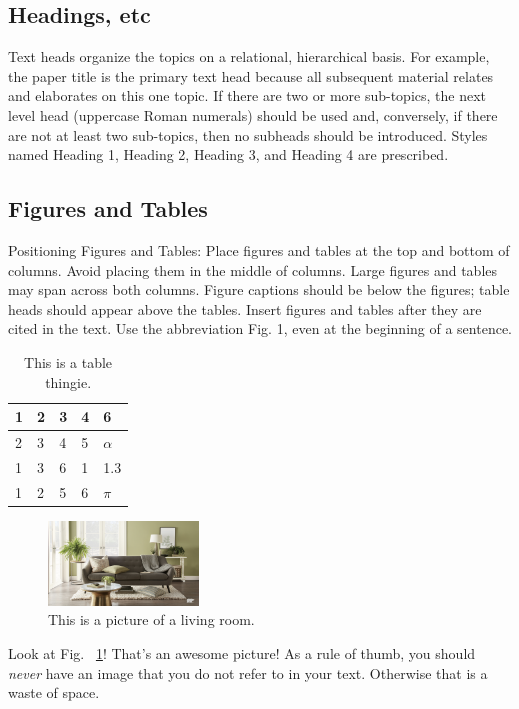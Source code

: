 \documentclass[letterpaper, 10 pt, conference]{ieeeconf}  %
\begin{document}
\subsection{Headings, etc}

Text heads organize the topics on a relational, hierarchical basis. For example, the paper title is the primary text head because all subsequent material relates and elaborates on this one topic. If there are two or more sub-topics, the next level head (uppercase Roman numerals) should be used and, conversely, if there are not at least two sub-topics, then no subheads should be introduced. Styles named Heading 1, Heading 2, Heading 3, and Heading 4 are prescribed.

\subsection{Figures and Tables}

Positioning Figures and Tables: Place figures and tables at the top and bottom of columns. Avoid placing them in the middle of columns. Large figures and tables may span across both columns. Figure captions should be below the figures; table heads should appear above the tables. Insert figures and tables after they are cited in the text. Use the abbreviation Fig. 1, even at the beginning of a sentence.

\begin{table}[]
\centering
\begin{tabular}{|l|l|l|l|l|}
\hline
1 & 2 & 3 & 4 & 6 \\ \hline
2 & 3 & 4 & 5 & $\alpha$ \\ \hline
1 & 3 & 6 & 1 & 1.3 \\ \hline
1 & 2 & 5 & 6 &  $\pi$ \\ \hline
\end{tabular}
\caption{This is a table thingie.}
\end{table}

\begin{figure}[htp]
\centering
\includegraphics[width=4cm]{livingroom.jpeg}
\caption{This is a picture of a living room.}
\label{fig:livingroom}
\end{figure}  
   
 Look at Fig. ~\ref{fig:livingroom}! That's an awesome picture! As a rule of thumb, 
 you should \emph{never} have an image that you do not refer to in your text. Otherwise
 that is a waste of space. 
\end{document}
